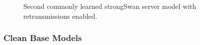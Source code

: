 \begin{figure}[ht]
	\vspace*{\fill}
	\noindent
	\hspace*{-5.5\oddsidemargin}%
	\caption{Second commonly learned strongSwan server model with retransmissions enabled.}
	\label{fig:ret_case2}
	\vspace*{\fill}
\end{figure}
\newpage

\subsubsection*{Clean Base Models}

